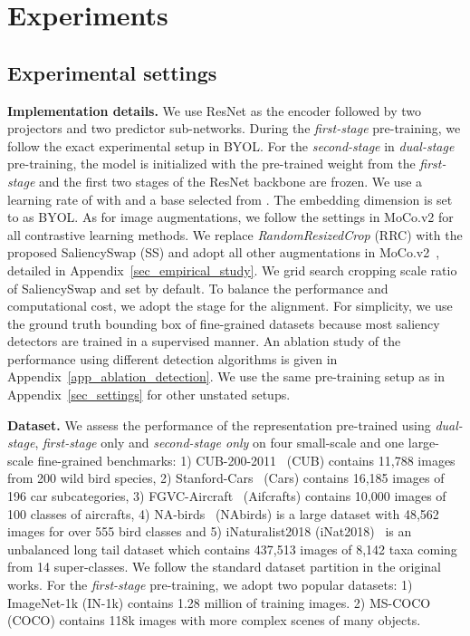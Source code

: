 \vspace{-0.5em}
\section{Experiments}
\label{sec_exp}


\subsection{Experimental settings}
\textbf{Implementation details.}\quad
We use ResNet as the encoder  followed by two projectors and two predictor sub-networks. During the \textit{first-stage} pre-training, we follow the exact experimental setup in BYOL. For the \textit{second-stage} in \textit{dual-stage} pre-training, the model is initialized with the pre-trained weight from the \textit{first-stage} and the first two stages of the ResNet backbone are frozen. We use a learning rate of  with  and a base  selected from . The embedding dimension is set to  as BYOL. As for image augmentations, we follow the settings in MoCo.v2 for all contrastive learning methods. We replace \textit{RandomResizedCrop} (RRC) with the proposed SaliencySwap (SS) and adopt all other augmentations in MoCo.v2~\cite{2020mocov2}, detailed in Appendix~\ref{sec_empirical_study}. We grid search cropping scale ratio of SaliencySwap  and set  by default. To balance the performance and computational cost, we adopt the stage  for the alignment. For simplicity, we use the ground truth bounding box of fine-grained datasets because most saliency detectors are trained in a supervised manner. 
An ablation study of the performance using different detection algorithms is given in Appendix~\ref{app_ablation_detection}.
We use the same pre-training setup as in Appendix~\ref{sec_settings} for other unstated setups.

\textbf{Dataset.}\quad
We assess the performance of the representation pre-trained using \textit{dual-stage}, \textit{first-stage} only and \textit{second-stage only} on four small-scale and one large-scale fine-grained benchmarks: 1) CUB-200-2011~\cite{wah2011caltech} (CUB) contains 11,788 images from 200 wild bird species, 2) Stanford-Cars~\cite{krause20133d} (Cars) contains 16,185 images of 196 car subcategories, 3) FGVC-Aircraft~\cite{maji2013fine} (Aifcrafts) contains 10,000 images of 100 classes of aircrafts, 4) NA-birds~\cite{van2015building} (NAbirds) is a large dataset with 48,562 images for over 555 bird classes and 5) iNaturalist2018 (iNat2018)~\cite{cvpr2018inaturalist} is an unbalanced long tail dataset which contains 437,513 images of 8,142 taxa coming from 14 super-classes. We follow the standard dataset partition in the original works. For the \textit{first-stage} pre-training, we adopt two popular datasets: 1) ImageNet-1k (IN-1k) contains 1.28 million of training images. 2) MS-COCO (COCO) contains 118k images with more complex scenes of many objects.



